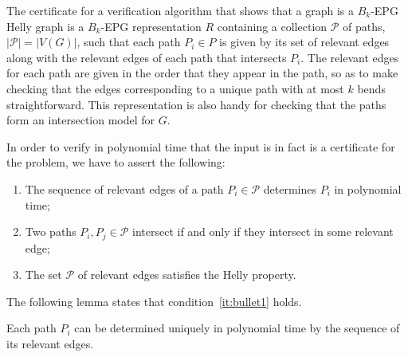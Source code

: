 \documentclass[runningheads]{llncs}
\begin{document}
The certificate for a verification algorithm  that shows that a graph is a $B_k$-EPG Helly graph is a  $B_k$-EPG representation $R$ containing a collection $\mathcal{P}$ of paths, $|\mathcal{P}| = |V(G)|$, such that  each path $P_i \in P$ is given by its set of relevant edges along with the relevant edges of each path that intersects $P_i$.  The relevant edges for each path are given in the order that they appear in the path, so as to make checking that the edges corresponding to a unique path with at most $k$ bends straightforward.  This representation is also handy for checking that the paths form an intersection model for $G$.

In order to verify in polynomial time that the input is in fact is a certificate for the problem, we have to assert the following:

\begin{enumerate}[label=(\roman*)]
\item The sequence of relevant edges of a path $P_i\in \mathcal{P}$ determines $P_i$ in polynomial time; \label{it:bullet1}

\item Two paths $P_i, P_j \in \mathcal{P}$ intersect if and only if they intersect in some relevant edge; \label{it:bullet2}

\item The set $\mathcal{P}$ of relevant edges satisfies the Helly property.  \label{it:bullet3}
\end{enumerate}



The following lemma states that condition~\ref{it:bullet1} holds. 



\begin{lemma}\label{lem:verify1}
Each path $P_i$ can be determined uniquely in polynomial time by the sequence of its relevant edges.
\end{lemma}

\end{document}

